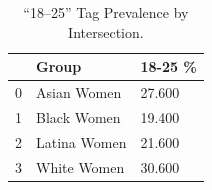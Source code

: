 \begin{table}[htbp]
\centering
\caption{“18–25” Tag Prevalence by Intersection.}
\label{tab:eda_age_tag_by_group}
\begin{tabular}{lll}
\toprule
 & Group & 18-25 \% \\
\midrule
0 & Asian Women & 27.600 \\
1 & Black Women & 19.400 \\
2 & Latina Women & 21.600 \\
3 & White Women & 30.600 \\
\bottomrule
\end{tabular}

\end{table}
